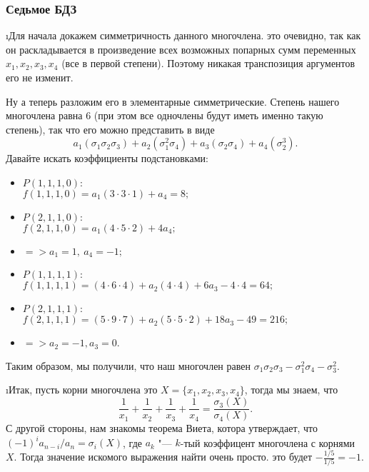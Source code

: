 \subsubsection{Седьмое БДЗ}

\i Для начала докажем симметричность данного многочлена. это очевидно, так как он раскладывается в произведение всех возможных попарных сумм переменных $x_1, x_2, x_3, x_4$ (все в первой степени). Поэтому никакая транспозиция аргументов его не изменит.
\par Ну а теперь разложим его в элементарные симметрические. Степень нашего многочлена равна 6 (при этом все одночлены будут иметь именно такую степень), так что его можно представить в виде
    $$a_1(\sigma_1\sigma_2\sigma_3) + a_2(\sigma_1^2\sigma_4) + a_3(\sigma_2\sigma_4) + a_4(\sigma_2^3).$$
Давайте искать коэффициенты подстановками:
\begin{itemize}
    \item $P(1, 1, 1, 0):$ \\
        $f(1, 1, 1, 0) = a_1(3\cdot3\cdot1) + a_4 = 8;$
    \item $P(2, 1, 1, 0):$ \\
        $f(2, 1, 1, 0) = a_1(4\cdot5\cdot2) + 4a_4;$
    \item $=> a_1 = 1,\ a_4 = -1;$
    \item $P(1, 1, 1, 1):$ \\
        $f(1, 1, 1, 1) = (4\cdot6\cdot4) + a_2(4\cdot4) + 6a_3 - 4\cdot4 = 64;$
    \item $P(2, 1, 1, 1):$ \\
        $f(2, 1, 1, 1) = (5\cdot9\cdot7) + a_2(5\cdot5\cdot2) + 18a_3 - 49 = 216;$
    \item $=> a_2 = -1, a_3 = 0.$
\end{itemize}
Таким образом, мы получили, что наш многочлен равен $\sigma_1\sigma_2\sigma_3 - \sigma_1^2\sigma_4 - \sigma_3^2.$


\i Итак, пусть корни многочлена это $X = \{x_1, x_2, x_3, x_4\}$, тогда мы знаем, что 
    $$\frac{1}{x_1} + \frac{1}{x_2} + \frac{1}{x_3} + \frac{1}{x_4} = \frac{\sigma_3(X)}{\sigma_4(X)}.$$
С другой стороны, нам знакомы теорема Виета, котора утверждает, что $(-1)^ia_{n-i}/a_n = \sigma_i(X)$, где $a_k$ "--- $k$-тый коэффицент многочлена с корнями $X$. Тогда значение искомого выражения найти очень просто. это будет $-\frac{1/5}{1/5} = -1$.


